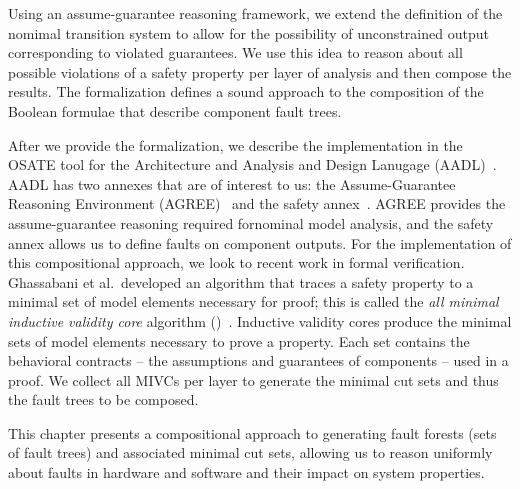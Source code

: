 Using an assume-guarantee reasoning framework, we extend the definition of the nomimal transition system to allow for the possibility of unconstrained output corresponding to violated guarantees. We use this idea to reason about all possible violations of a safety property per layer of analysis and then compose the results. The formalization defines a sound approach to the composition of the Boolean formulae that describe component fault trees.

After we provide the formalization, we describe the implementation in the OSATE tool for the Architecture and Analysis and Design Lanugage (AADL)~\cite{FeilerModelBasedEngineering2012}. AADL has two annexes that are of interest to us: the Assume-Guarantee Reasoning Environment (AGREE)~\cite{cofer2012compositional} and the safety annex~\cite{stewart2020safety}. AGREE provides the assume-guarantee reasoning required fornominal model analysis, and the safety annex allows us to define faults on component outputs. For the implementation of this compositional approach, we look to recent work in formal verification. Ghassabani et al.~developed an algorithm that traces a safety property to a minimal set of model elements necessary for proof; this is called the \textit{all minimal inductive validity core} algorithm (\aivcalg)~\cite{GhassabaniGW16,Ghassabani2017EfficientGO}. Inductive validity cores produce the minimal sets of model elements necessary to prove a property. Each set contains the behavioral contracts -- the assumptions and guarantees of components -- used in a proof. We collect all MIVCs per layer to generate the minimal cut sets and thus the fault trees to be composed.


This chapter presents a compositional approach to generating fault forests (sets of fault trees) and associated minimal cut sets, allowing us to reason uniformly about faults in hardware and software and their impact on system properties. 






